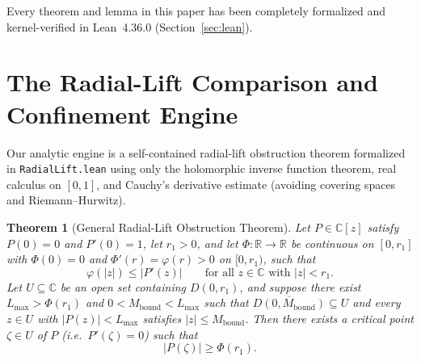 \documentclass[11pt,a4paper]{article}
\newtheorem{theorem}{Theorem}[section]
\theoremstyle{definition}
\theoremstyle{remark}
\newcommand{\CC}{\mathbb{C}}
\newcommand{\RR}{\mathbb{R}}
\begin{document}
Every theorem and lemma in this paper has been completely formalized and kernel-verified in Lean~4.36.0 (Section~\ref{sec:lean}).

\section{The Radial-Lift Comparison and Confinement Engine}
\label{sec:radial-lift}

Our analytic engine is a self-contained radial-lift obstruction theorem formalized in \texttt{RadialLift.lean} using only the holomorphic inverse function theorem, real calculus on $[0, 1]$, and Cauchy's derivative estimate (avoiding covering spaces and Riemann--Hurwitz).

\begin{theorem}[General Radial-Lift Obstruction Theorem]
\label{thm:radial-obstruction}
Let $P \in \CC[z]$ satisfy $P(0) = 0$ and $P'(0) = 1$, let $r_1 > 0$, and let $\Phi : \RR \to \RR$ be continuous on $[0, r_1]$ with $\Phi(0) = 0$ and $\Phi'(r) = \varphi(r) > 0$ on $[0, r_1)$, such that
\begin{equation}
\label{eq:radial-lb}
\varphi(|z|) \le |P'(z)| \qquad \text{for all } z \in \CC \text{ with } |z| < r_1.
\end{equation}
Let $U \subseteq \CC$ be an open set containing $D(0, r_1)$, and suppose there exist $L_{\max} > \Phi(r_1)$ and $0 < M_{\mathrm{bound}} < L_{\max}$ such that $\overline{D(0, M_{\mathrm{bound}})} \subseteq U$ and every $z \in U$ with $|P(z)| < L_{\max}$ satisfies $|z| \le M_{\mathrm{bound}}$. Then there exists a critical point $\zeta \in U$ of $P$ (i.e.\ $P'(\zeta) = 0$) such that
\[
|P(\zeta)| \ge \Phi(r_1).
\]
\end{theorem}
\end{document}
